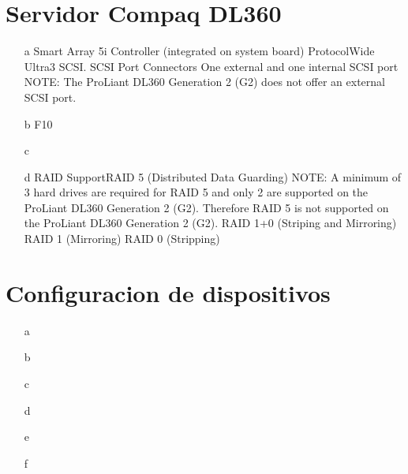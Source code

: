 \documentclass[a4paper]{article}
\begin{document}
\section{Servidor Compaq DL360}
\begin{enumerate}
\item[a] Smart Array 5i Controller 
(integrated on system board)
ProtocolWide Ultra3 SCSI. SCSI Port Connectors One external and one internal SCSI port
NOTE: The ProLiant DL360 Generation 2 (G2) does not offer an external SCSI port.
\item[b] F10
\item[c]
\item[d]RAID SupportRAID 5 (Distributed Data Guarding)
NOTE: A minimum of 3 hard drives are required for RAID 5 and only 2 are supported on the ProLiant DL360 Generation 2 (G2). Therefore RAID 5 is not supported on the ProLiant DL360 Generation 2 (G2). 
RAID 1+0 (Striping and Mirroring)
RAID 1 (Mirroring)
RAID 0 (Stripping)
\end{enumerate}
%
\section{Configuracion de dispositivos}
\begin{enumerate}
\item[a]
\item[b]
\item[c]
\item[d]
\item[e]
\item[f]
\end{enumerate}
%
\end{document}
